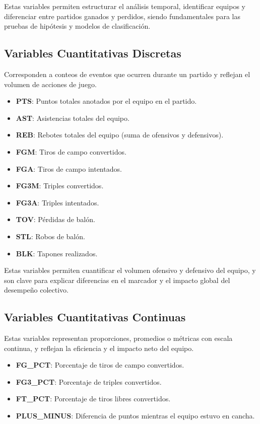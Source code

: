 \documentclass[12pt]{article}
\begin{document}
Estas variables permiten estructurar el análisis temporal, identificar equipos y diferenciar
entre partidos ganados y perdidos, siendo fundamentales para las pruebas de hipótesis
y modelos de clasificación.

\subsection{Variables Cuantitativas Discretas}

Corresponden a conteos de eventos que ocurren durante un partido y reflejan el volumen
de acciones de juego.

\begin{itemize}
    \item \textbf{PTS}: Puntos totales anotados por el equipo en el partido.
    \item \textbf{AST}: Asistencias totales del equipo.
    \item \textbf{REB}: Rebotes totales del equipo (suma de ofensivos y defensivos).
    \item \textbf{FGM}: Tiros de campo convertidos.
    \item \textbf{FGA}: Tiros de campo intentados.
    \item \textbf{FG3M}: Triples convertidos.
    \item \textbf{FG3A}: Triples intentados.
    \item \textbf{TOV}: Pérdidas de balón.
    \item \textbf{STL}: Robos de balón.
    \item \textbf{BLK}: Tapones realizados.
\end{itemize}

Estas variables permiten cuantificar el volumen ofensivo y defensivo del equipo, y son clave
para explicar diferencias en el marcador y el impacto global del desempeño colectivo.

\subsection{Variables Cuantitativas Continuas}

Estas variables representan proporciones, promedios o métricas con escala continua,
y reflejan la eficiencia y el impacto neto del equipo.

\begin{itemize}
    \item \textbf{FG\_PCT}: Porcentaje de tiros de campo convertidos.
    \item \textbf{FG3\_PCT}: Porcentaje de triples convertidos.
    \item \textbf{FT\_PCT}: Porcentaje de tiros libres convertidos.
    \item \textbf{PLUS\_MINUS}: Diferencia de puntos mientras el equipo estuvo en cancha.
\end{itemize}
\end{document}
